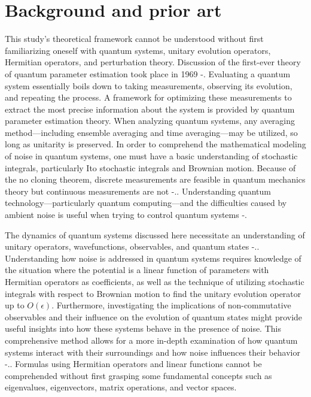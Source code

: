 \documentclass[journal,twocolumn]{IEEEtran}
\begin{document}
\section{Background and prior art}
This study's theoretical framework cannot be understood without first familiarizing oneself with quantum systems, unitary evolution operators, Hermitian operators, and perturbation theory. Discussion of the first-ever theory of quantum parameter estimation took place in 1969 \cite{Ref1}-\cite{Ref6}. Evaluating a quantum system essentially boils down to taking measurements, observing its evolution, and repeating the process. A framework for optimizing these measurements to extract the most precise information about the system is provided by quantum parameter estimation theory.  When analyzing quantum systems, any averaging method—including ensemble averaging and time averaging—may be utilized, so long as unitarity is preserved. In order to comprehend the mathematical modeling of noise in quantum systems, one must have a basic understanding of stochastic integrals, particularly Ito stochastic integrals and Brownian motion. Because of the no cloning theorem, discrete measurements are feasible in quantum mechanics theory but continuous measurements are not \cite{Ref7}-\cite{Ref9}.. Understanding quantum technology—particularly quantum computing—and the difficulties caused by ambient noise is useful when trying to control quantum systems \cite{Ref10}-\cite{Ref14}.

The dynamics of quantum systems discussed here necessitate an understanding of unitary operators, wavefunctions, observables, and quantum states \cite{Ref15}-\cite{Ref18}.. Understanding how noise is addressed in quantum systems requires knowledge of the situation where the potential is a linear function of parameters with Hermitian operators as coefficients, as well as the technique of utilizing stochastic integrals with respect to Brownian motion to find the unitary evolution operator up to $O(\epsilon)$. Furthermore, investigating the implications of non-commutative observables and their influence on the evolution of quantum states might provide useful insights into how these systems behave in the presence of noise. This comprehensive method allows for a more in-depth examination of how quantum systems interact with their surroundings and how noise influences their behavior \cite{Ref19}-\cite{Ref23}.. Formulas using Hermitian operators and linear functions cannot be comprehended without first grasping some fundamental concepts such as eigenvalues, eigenvectors, matrix operations, and vector spaces. 
\end{document}
